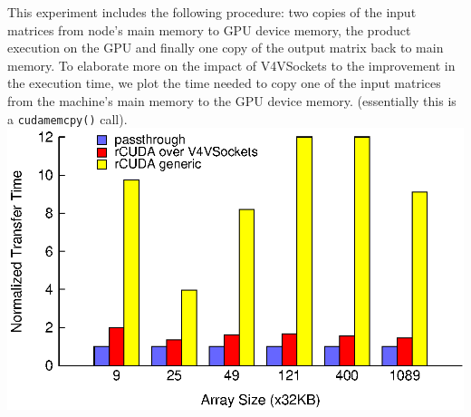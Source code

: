 \documentclass[a0paper,portrait,final]{baposter}
\begin{document}
\begin{poster}
{\begin{multicols}{3}
\vspace{0.5em}
\vspace{0.5em}
This experiment includes the following procedure: two copies of the input
matrices from node's main memory to GPU device memory, the product execution on
the GPU and finally one copy of the output matrix back to main memory. %
To elaborate more on the impact of V4VSockets to the improvement in the
execution time, we plot the time needed to copy one of the input
matrices from the machine's main memory to the GPU device memory. (essentially
this is a \texttt{cudamemcpy()} call).
\vspace{0.5em}
\includegraphics[width=\linewidth]{figures/matrixA_cublas_throughput.eps}
\end{multicols}


\vspace{1em}
}

\end{poster}
\end{document}
